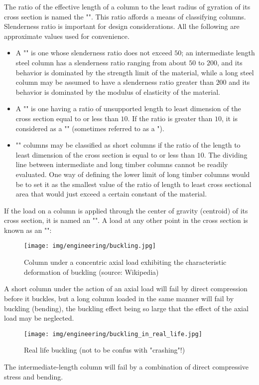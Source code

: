 	The ratio of the effective length of a column to the least radius of gyration of its cross section is named the "". This ratio affords a means of classifying columns. Slenderness ratio is important for design considerations. All the following are approximate values used for convenience.
	\begin{itemize}
		\item A "" is one whose slenderness ratio does not exceed $50$; an intermediate length steel column has a slenderness ratio ranging from about $50$ to $200$, and its behavior is dominated by the strength limit of the material, while a long steel column may be assumed to have a slenderness ratio greater than $200$ and its behavior is dominated by the modulus of elasticity of the material.
	
		\item A "" is one having a ratio of unsupported length to least dimension of the cross section equal to or less than $10$. If the ratio is greater than $10$, it is considered as a "" (sometimes referred to as a ").
	
		\item "" columns may be classified as short columns if the ratio of the length to least dimension of the cross section is equal to or less than $10$. The dividing line between intermediate and long timber columns cannot be readily evaluated. One way of defining the lower limit of long timber columns would be to set it as the smallest value of the ratio of length to least cross sectional area that would just exceed a certain constant of the material.
	\end{itemize}
	If the load on a column is applied through the center of gravity (centroid) of its cross section, it is named an "". A load at any other point in the cross section is known as an "":
	\begin{figure}[H]
		\centering
		\texttt{[image: img/engineering/buckling.jpg]}
		\caption[Column under a concentric axial load exhibiting the characteristic deformation of buckling]{Column under a concentric axial load exhibiting the characteristic deformation of buckling (source: Wikipedia)}
	\end{figure}
	A short column under the action of an axial load will fail by direct compression before it buckles, but a long column loaded in the same manner will fail by buckling (bending), the buckling effect being so large that the effect of the axial load may be neglected.
	\begin{figure}[H]
		\centering
		\texttt{[image: img/engineering/buckling\_in\_real\_life.jpg]}
		\caption{Real life buckling (not to be confus with "crashing"!)}
	\end{figure}
	 The intermediate-length column will fail by a combination of direct compressive stress and bending.

